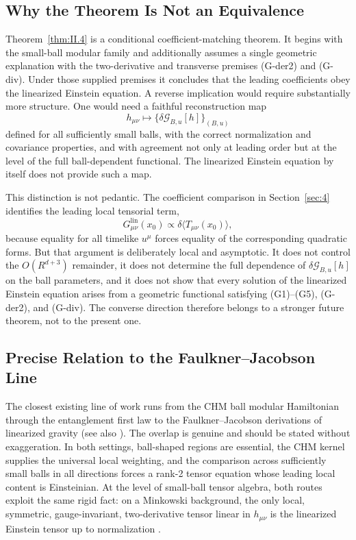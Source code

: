 \documentclass[12pt]{article}
\theoremstyle{definition}
\theoremstyle{remark}
\begin{document}
\subsection{Why the Theorem Is Not an Equivalence}\label{subsec:6.1}

Theorem~\ref{thm:II.4} is a conditional coefficient-matching theorem.
It begins with the small-ball modular family and additionally assumes a
single geometric explanation with the two-derivative and transverse
premises (G-der2) and (G-div). Under those supplied premises it concludes
that the leading coefficients obey the linearized Einstein equation. A
reverse implication would require substantially more structure. One
would need a faithful reconstruction map
\[
h_{\mu\nu}
\longmapsto
\{\delta\mathcal{G}_{B,u}[h]\}_{(B,u)}
\]
defined for all sufficiently small balls, with the correct normalization and covariance properties, and with agreement not only at leading order but at the level of the full ball-dependent functional. The linearized Einstein equation by itself does not provide such a map.

This distinction is not pedantic. The coefficient comparison in Section~\ref{sec:4} identifies the leading local tensorial term,
\[
G^{\mathrm{lin}}_{\mu\nu}(x_0)
\propto
\delta\langle T_{\mu\nu}(x_0)\rangle,
\]
because equality for all timelike \(u^\mu\) forces equality of the corresponding quadratic forms. But that argument is deliberately local and asymptotic. It does not control the \(O(R^{d+3})\) remainder, it does not determine the full dependence of \(\delta\mathcal{G}_{B,u}[h]\) on the ball parameters, and it does not show that every solution of the linearized Einstein equation arises from a geometric functional satisfying (G1)--(G5), (G-der2), and (G-div). The converse direction therefore belongs to a stronger future theorem, not to the present one.

\subsection{Precise Relation to the Faulkner--Jacobson Line}\label{subsec:6.2}

The closest existing line of work runs from the CHM ball modular Hamiltonian through the entanglement first law to the Faulkner\cite{Faulkner2014}--Jacobson\cite{Jacobson2016} derivations of linearized gravity (see also \cite{Lashkari2014}). The overlap is genuine and should be stated without exaggeration. In both settings, ball-shaped regions are essential, the CHM kernel supplies the universal local weighting, and the comparison across sufficiently small balls in all directions forces a rank-2 tensor equation whose leading local content is Einsteinian. At the level of small-ball tensor algebra, both routes exploit the same rigid fact: on a Minkowski background, the only local, symmetric, gauge-invariant, two-derivative tensor linear in \(h_{\mu\nu}\) is the linearized Einstein tensor up to normalization \cite{Lovelock1971}.
\end{document}
